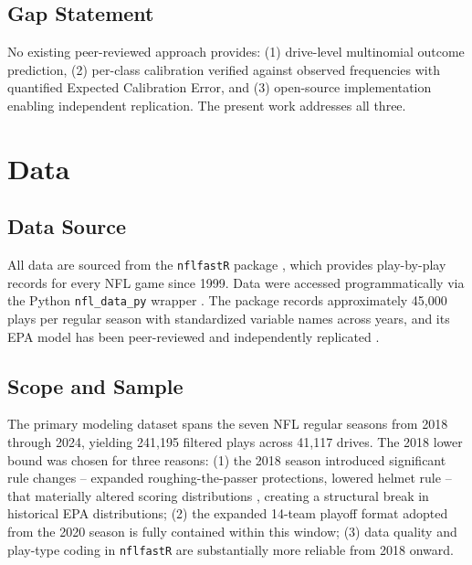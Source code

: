 \documentclass[12pt,a4paper]{article}
\begin{document}
\subsection{Gap Statement}

No existing peer-reviewed approach provides: (1) drive-level multinomial outcome prediction, (2) per-class calibration verified against observed frequencies with quantified Expected Calibration Error, and (3) open-source implementation enabling independent replication. The present work addresses all three.

\section{Data}
\label{sec:data}

\subsection{Data Source}

All data are sourced from the \texttt{nflfastR} package \citep{carl2021nflfastr}, which provides play-by-play records for every NFL game since 1999. Data were accessed programmatically via the Python \texttt{nfl\_data\_py} wrapper \citep{cooper2023nfldatapy}. The package records approximately 45,000 plays per regular season with standardized variable names across years, and its EPA model has been peer-reviewed and independently replicated \citep{yurko2019nflwar}.

\subsection{Scope and Sample}

The primary modeling dataset spans the seven NFL regular seasons from 2018 through 2024, yielding 241,195 filtered plays across 41,117 drives. The 2018 lower bound was chosen for three reasons: (1) the 2018 season introduced significant rule changes -- expanded roughing-the-passer protections, lowered helmet rule -- that materially altered scoring distributions \citep{pereira2018roughing}, creating a structural break in historical EPA distributions; (2) the expanded 14-team playoff format adopted from the 2020 season is fully contained within this window; (3) data quality and play-type coding in \texttt{nflfastR} are substantially more reliable from 2018 onward.
\end{document}
